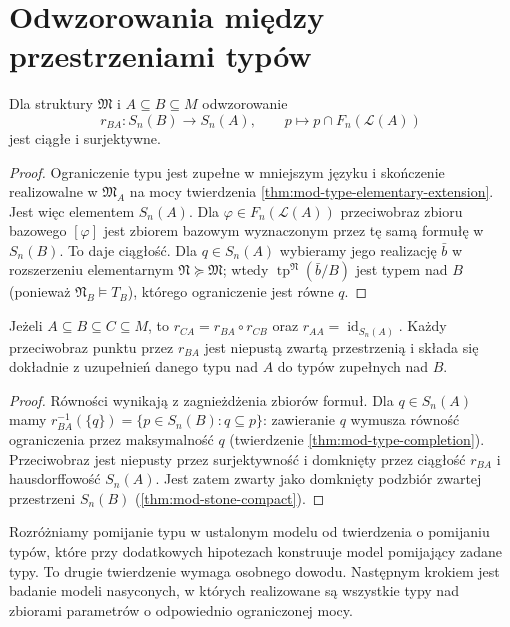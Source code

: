 \section{Odwzorowania między przestrzeniami typów}
\begin{twierdzenie}
\label{thm:mod-type-restriction}
Dla struktury $\mathfrak M$ i $A\subseteq B\subseteq M$
odwzorowanie
\[
r_{BA}:S_n(B)\longrightarrow S_n(A),\qquad
p\longmapsto p\cap F_n(\mathcal L(A))
\]
jest ciągłe i surjektywne.
\end{twierdzenie}
\begin{proof}
Ograniczenie typu jest zupełne w mniejszym języku
i skończenie realizowalne w $\mathfrak M_A$
na mocy twierdzenia \ref{thm:mod-type-elementary-extension}.
Jest więc elementem $S_n(A)$.
Dla $\varphi\in F_n(\mathcal L(A))$ przeciwobraz
zbioru bazowego $[\varphi]$ jest zbiorem bazowym
wyznaczonym przez tę samą formułę w $S_n(B)$.
To daje ciągłość. Dla $q\in S_n(A)$ wybieramy
jego realizację $\bar b$ w rozszerzeniu elementarnym
$\mathfrak N\succeq\mathfrak M$; wtedy
$\operatorname{tp}^{\mathfrak N}(\bar b/B)$ jest typem
nad $B$ (ponieważ $\mathfrak N_B\models T_B$), którego
ograniczenie jest równe $q$.
\end{proof}

\begin{wniosek}
\label{cor:mod-type-restriction-composition}
Jeżeli $A\subseteq B\subseteq C\subseteq M$, to
$r_{CA}=r_{BA}\circ r_{CB}$ oraz $r_{AA}=\operatorname{id}_{S_n(A)}$.
Każdy przeciwobraz punktu przez $r_{BA}$ jest niepustą
zwartą przestrzenią i składa się dokładnie z uzupełnień
danego typu nad $A$ do typów zupełnych nad $B$.
\end{wniosek}
\begin{proof}
Równości wynikają z zagnieżdżenia zbiorów formuł.
Dla $q\in S_n(A)$ mamy
$r_{BA}^{-1}(\{q\})=\{p\in S_n(B):q\subseteq p\}$:
zawieranie $q$ wymusza równość ograniczenia przez maksymalność
$q$ (twierdzenie \ref{thm:mod-type-completion}).
Przeciwobraz jest niepusty przez surjektywność i domknięty
przez ciągłość $r_{BA}$ i hausdorffowość $S_n(A)$.
Jest zatem zwarty jako domknięty podzbiór zwartej
przestrzeni $S_n(B)$ (\ref{thm:mod-stone-compact}).
\end{proof}

\begin{uwaga}
Rozróżniamy pomijanie typu w ustalonym modelu od twierdzenia
o pomijaniu typów, które przy dodatkowych hipotezach
konstruuje model pomijający zadane typy. To drugie twierdzenie
wymaga osobnego dowodu. Następnym krokiem jest badanie modeli nasyconych,
w których realizowane są wszystkie typy nad zbiorami
parametrów o odpowiednio ograniczonej mocy.
\end{uwaga}
